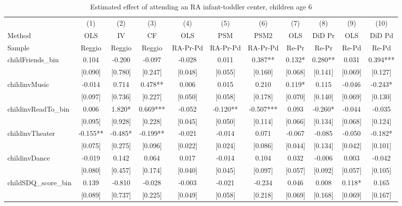 \documentclass[12pt]{article}
\begin{document}
\begin{table}[ht]
\caption{Estimated effect of attending an RA infant-toddler center, children
age 6}

\label{tab:childIT}
\begin{center}
\begin{adjustbox}{width=1.2\textwidth,center=\textwidth}
\small
\begin{tabular}{l*{10}{c}}
\hline\hline
& (1) & (2) & (3) & (4) & (5) & (6) & (7) & (8) & (9) & (10) \\ 
Method & OLS & IV & CF & OLS & PSM & PSM2 & OLS & DiD Pr & OLS & DiD Pd \\
Sample & Reggio & Reggio & Reggio & RA-Pr-Pd & RA-Pr-Pd & RA-Pr-Pd & Re-Pr & Re-Pr & Re-Pd & Re-Pd \\
\hline
childFriends\_bin & 0.104 & -0.200 & -0.097 & -0.028 & 0.011 & 0.387** & 0.132* & 0.280** & 0.031 & 0.394*** \\
 & [0.090] & [0.780] & [0.247] & [0.048] & [0.055] & [0.160] & [0.068] & [0.141] & [0.069] & [0.127] \\
childinvMusic & -0.014 & 0.714 & 0.478** & 0.006 & 0.015 & 0.210 & 0.119* & 0.115 & -0.046 & -0.243* \\
 & [0.097] & [0.736] & [0.227] & [0.050] & [0.058] & [0.178] & [0.070] & [0.140] & [0.069] & [0.130] \\
childinvReadTo\_bin & 0.006 & 1.820* & 0.669*** & -0.052 & -0.120** & -0.507*** & 0.093 & -0.260* & -0.044 & -0.035 \\
 & [0.095] & [0.928] & [0.228] & [0.045] & [0.050] & [0.114] & [0.066] & [0.134] & [0.068] & [0.124] \\
childinvTheater & -0.155** & -0.485* & -0.199** & -0.021 & -0.014 & 0.071 & -0.067 & -0.085 & -0.050 & -0.182* \\
 & [0.075] & [0.275] & [0.096] & [0.022] & [0.024] & [0.086] & [0.044] & [0.134] & [0.042] & [0.101] \\
childinvDance & -0.019 & 0.142 & 0.064 & 0.017 & -0.014 & 0.104 & 0.032 & -0.006 & 0.003 & -0.042 \\
 & [0.080] & [0.457] & [0.174] & [0.040] & [0.045] & [0.097] & [0.057] & [0.092] & [0.057] & [0.105] \\
childSDQ\_score\_bin & 0.139 & -0.810 & -0.028 & -0.003 & -0.021 & -0.234 & 0.046 & 0.008 & 0.118* & 0.165 \\
 & [0.089] & [0.737] & [0.225] & [0.049] & [0.058] & [0.218] & [0.069] & [0.168] & [0.069] & [0.167] \\

\end{tabular}
\end{adjustbox}
\end{center}
\end{table}
\end{document}
